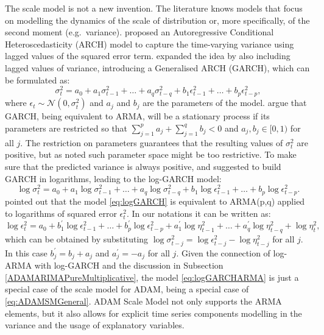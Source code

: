 \documentclass[]{book}
\theoremstyle{definition}
\theoremstyle{definition}
\theoremstyle{definition}
\theoremstyle{definition}
\theoremstyle{remark}
\begin{document}
The scale model is not a new invention. The literature knows models that focus on modelling the dynamics of the scale of distribution or, more specifically, of the second moment (e.g.~variance). \citet{Engle1982} proposed an Autoregressive Conditional Heteroscedasticity (ARCH) model to capture the time-varying variance using lagged values of the squared error term. \citet{Bollerlev1986} expanded the idea by also including lagged values of variance, introducing a Generalised ARCH (GARCH), which can be formulated as:
\begin{equation}
    \sigma_t^2 = a_0 + a_1 \sigma_{t-1}^2 + \dots + a_q \sigma_{t-q}^2 + b_1 \epsilon_{t-1}^2 + \dots + b_p \epsilon_{t-p}^2 ,
    \label{eq:GARCH}
\end{equation}
where \(\epsilon_t\sim \mathcal{N}(0,\sigma_t^2)\) and \(a_j\) and \(b_j\) are the parameters of the model. \citet{Bollerlev1986} argue that GARCH, being equivalent to ARMA, will be a stationary process if its parameters are restricted so that \(\sum_{j=1}^p a_j + \sum_{j=1}^q b_j < 0\) and \(a_j, b_j \in [0,1)\) for all \(j\). The restriction on parameters guarantees that the resulting values of \(\sigma_t^2\) are positive, but as \citet{Pantula1986} noted such parameter space might be too restrictive. To make sure that the predicted variance is always positive, \citet{Geweke1986} and \citet{Pantula1986} suggested to build GARCH in logarithms, leading to the log-GARCH model:
\begin{equation}
    \log \sigma_t^2 = a_0 + a_1 \log \sigma_{t-1}^2 + \dots + a_q \log \sigma_{t-q}^2 + b_1 \log \epsilon_{t-1}^2 + \dots + b_p \log \epsilon_{t-p}^2 .
    \label{eq:logGARCH}
\end{equation}
\citet{Pantula1986} pointed out that the model \eqref{eq:logGARCH} is equivalent to ARMA(p,q) applied to logarithms of squared error \(\epsilon_t^2\). In our notations it can be written as:
\begin{equation}
    \log \epsilon_t^2 = a_0 + b_1^\prime \log \epsilon_{t-1}^2 + \dots + b_p^\prime \log \epsilon_{t-p}^2 + a_1^\prime \log \eta_{t-1}^2 + \dots + a_q^\prime \log \eta_{t-q}^2 + \log \eta_t^2,
    \label{eq:logGARCHARMA}
\end{equation}
which can be obtained by substituting \(\log \sigma_{t-j}^2 = \log \epsilon_{t-j}^2 -\log \eta_{t-j}^2\) for all \(j\). In this case \(b_j^\prime = b_j + a_j\) and \(a_j^\prime=-a_j\) for all \(j\). Given the connection of log-ARMA with log-GARCH and the discussion in Subsection \ref{ADAMARIMAPureMultiplicative}, the model \eqref{eq:logGARCHARMA} is just a special case of the scale model for ADAM, being a special case of \eqref{eq:ADAMSMGeneral}. ADAM Scale Model not only supports the ARMA elements, but it also allows for explicit time series components modelling in the variance and the usage of explanatory variables.
\end{document}
